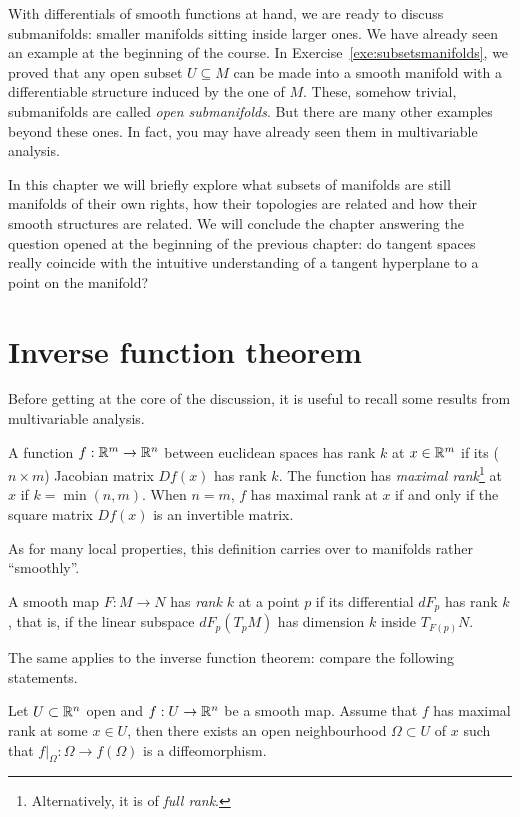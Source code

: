 With differentials of smooth functions at hand, we are ready to discuss submanifolds: smaller manifolds sitting inside larger ones.
We have already seen an example at the beginning of the course.
In Exercise~\ref{exe:subsetsmanifolds}, we proved that any open subset $U\subseteq M$ can be made into a smooth manifold with a differentiable structure induced by the one of $M$.
These, somehow trivial, submanifolds are called \emph{open submanifolds}.
But there are many other examples beyond these ones.
In fact, you may have already seen them in multivariable analysis.

In this chapter we will briefly explore what subsets of manifolds are still manifolds of their own rights, how their topologies are related and how their smooth structures are related.
We will conclude the chapter answering the question opened at the beginning of the previous chapter: do tangent spaces really coincide with the intuitive understanding of a tangent hyperplane to a point on the manifold?

\section{Inverse function theorem}

Before getting at the core of the discussion, it is useful to
recall some results from multivariable analysis.

A function $f:\mathbb{R}^m \to \mathbb{R}^n$ between euclidean spaces has rank $k$ at $x\in\mathbb{R}^m$ if its ($n\times m$) Jacobian matrix $Df(x)$ has rank $k$.
The function has \emph{maximal rank}\footnote{Alternatively, it is of \emph{full rank}.} at $x$ if $k = \min(n,m)$.
When $n=m$, $f$ has maximal rank at $x$ if and only if the square matrix $Df(x)$ is an invertible matrix.

As for many local properties, this definition carries over to manifolds rather ``smoothly''.
%
\begin{definition}
    A smooth map $F:M\to N$ has \emph{rank $k$} at a point $p$ if its differential $dF_p$ has rank $k$, that is, if the linear subspace $dF_p(T_pM)$ has dimension $k$ inside $T_{F(p)}N$.
\end{definition}
%
The same applies to the inverse function theorem:
compare the following statements.
%
\begin{theorem}\label{thm:ift}
  Let $U\subset\mathbb{R}^n$ open and $f:U \to \mathbb{R}^n$ be a smooth map.
  Assume that $f$ has maximal rank at some $x\in U$, then there exists an open neighbourhood $\Omega\subset U$ of $x$ such that  $f\big|_\Omega : \Omega \to f(\Omega)$ is a diffeomorphism.
\end{theorem}

